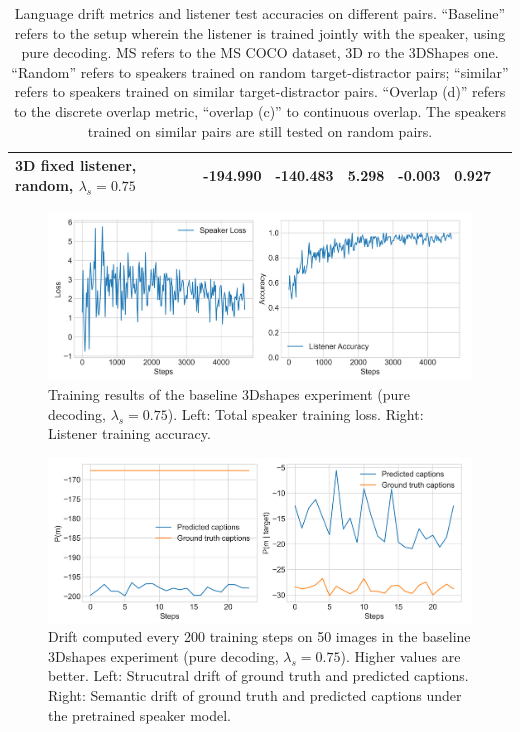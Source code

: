 \begin{table}[]
\begin{tabularx}{\textwidth}{|X|l|l|X|X|X|X|}
		3D fixed listener, random, $\lambda_s = 0.75$&      -194.990          &     -140.483                  &             5.298         &         -0.003            &                   0.927                      &                                           \\ \hline
	\end{tabularx}
	\caption{\label{tab:3dshapes_drift_metrics_basic_baseline} Language drift metrics and listener test accuracies on different pairs. 
		``Baseline'' refers to the setup wherein the listener is trained jointly with the speaker, using pure decoding. MS refers to the MS COCO dataset, 3D ro the 3DShapes one. ``Random'' refers to speakers trained on random target-distractor pairs; ``similar'' refers to speakers trained on similar target-distractor pairs. ``Overlap (d)'' refers to the discrete overlap metric, ``overlap (c)'' to continuous overlap. The speakers trained on similar pairs are still tested on random pairs.}
\end{table}

\begin{figure}[h]
	\centering
	\includegraphics[width=\linewidth]{images/3dshapes_refgame_49_pure_075.png}
	\caption{Training results of the baseline 3Dshapes experiment (pure decoding, $\lambda_s = 0.75$). Left: Total speaker training loss. Right: Listener training accuracy.}
	\label{fig:3dshapes_baseline_075_speaker_loss_listener_acc}
\end{figure}


\begin{figure}
	\centering
	\includegraphics[width=\linewidth]{images/3dshapes_structural_semantic_drift_49_pure_075_random.png}
	\caption{Drift computed every 200 training steps on 50 images in the baseline 3Dshapes experiment (pure decoding, $\lambda_s = 0.75$). Higher values are better. Left: Strucutral drift of ground truth and predicted captions. Right: Semantic drift of ground truth and predicted captions under the pretrained speaker model.} 
	\label{fig:3dshapes_baseline_075_str_drift}
\end{figure}

